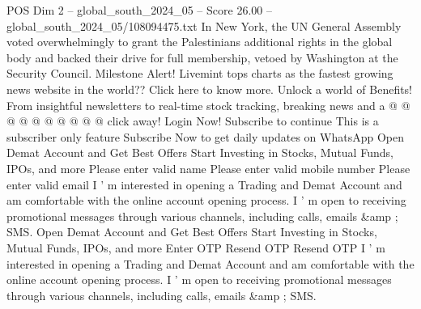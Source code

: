 \begin{textsample}{POS Dim 2 – global\_south\_2024\_05 – Score 26.00 – global\_south\_2024\_05/108094475.txt}
In New York, the UN General Assembly voted overwhelmingly to grant the Palestinians additional rights in the global body and backed their drive for full membership, vetoed by Washington at the Security Council.
Milestone Alert!
Livemint tops charts as the fastest growing news website in the world??
Click here to know more.
Unlock a world of Benefits!
From insightful newsletters to real-time stock tracking, breaking news and a @ @ @ @ @ @ @ @ @ @ click away!
Login Now!
Subscribe to continue This is a subscriber only feature Subscribe Now to get daily updates on WhatsApp Open Demat Account and Get Best Offers Start Investing in Stocks, Mutual Funds, IPOs, and more Please enter valid name Please enter valid mobile number Please enter valid email I ' m interested in opening a Trading and Demat Account and am comfortable with the online account opening process.
I ' m open to receiving promotional messages through various channels, including calls, emails \&amp ; SMS.
Open Demat Account and Get Best Offers Start Investing in Stocks, Mutual Funds, IPOs, and more Enter OTP Resend OTP Resend OTP I ' m interested in opening a Trading and Demat Account and am comfortable with the online account opening process.
I ' m open to receiving promotional messages through various channels, including calls, emails \&amp ; SMS.

\end{textsample}
